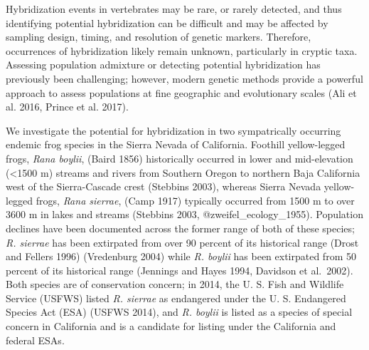 \documentclass[twoside,12pt,final]{ucthesis-CA2012} %
\begin{document}
\begin{ucmainmatter}
Hybridization events in vertebrates may be rare, or rarely detected, and
thus identifying potential hybridization can be difficult and may be
affected by sampling design, timing, and resolution of genetic markers.
Therefore, occurrences of hybridization likely remain unknown,
particularly in cryptic taxa. Assessing population admixture or
detecting potential hybridization has previously been challenging;
however, modern genetic methods provide a powerful approach to assess
populations at fine geographic and evolutionary scales (Ali et al. 2016,
Prince et al. 2017).

We investigate the potential for hybridization in two sympatrically
occurring endemic frog species in the Sierra Nevada of California.
Foothill yellow-legged frogs, \emph{Rana boylii}, (Baird 1856)
historically occurred in lower and mid-elevation (\textless{}1500 m)
streams and rivers from Southern Oregon to northern Baja California west
of the Sierra-Cascade crest (Stebbins 2003), whereas Sierra Nevada
yellow-legged frogs, \emph{Rana sierrae}, (Camp 1917) typically occurred
from 1500 m to over 3600 m in lakes and streams (Stebbins 2003,
@zweifel\_ecology\_1955). Population declines have been documented
across the former range of both of these species; \emph{R. sierrae} has
been extirpated from over 90 percent of its historical range (Drost and
Fellers 1996) (Vredenburg 2004) while \emph{R. boylii} has been
extirpated from 50 percent of its historical range (Jennings and Hayes
1994, Davidson et al.~2002). Both species are of conservation concern;
in 2014, the U. S. Fish and Wildlife Service (USFWS) listed \emph{R.
sierrae} as endangered under the U. S. Endangered Species Act (ESA)
(USFWS 2014), and \emph{R. boylii} is listed as a species of special
concern in California and is a candidate for listing under the
California and federal ESAs.


\end{ucmainmatter}
\end{document}
